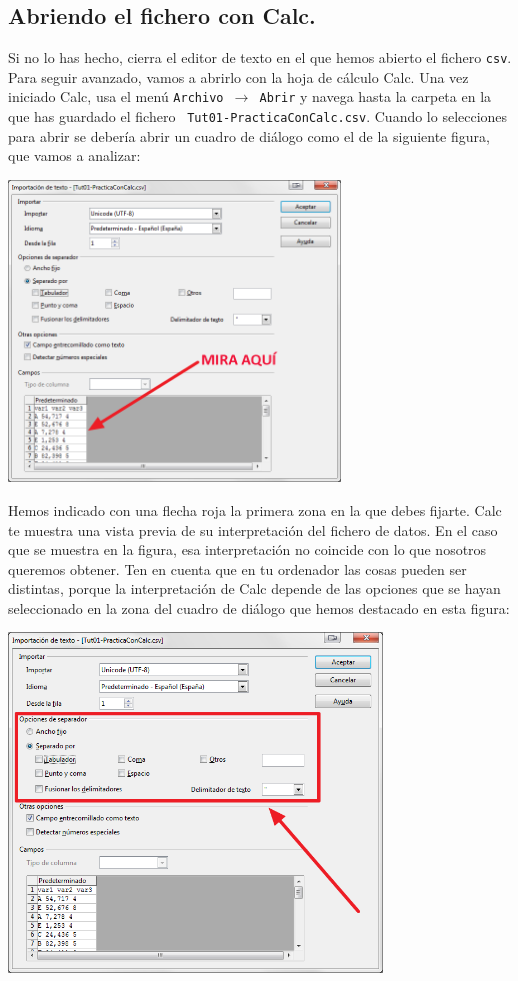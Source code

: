 \documentclass[10pt,a4paper]{article}
\begin{document}
\subsection{Abriendo el fichero con Calc.}

Si no lo has hecho, cierra el editor de texto en el que hemos abierto el fichero {\tt csv}. Para
seguir avanzado, vamos a abrirlo con la hoja de cálculo Calc. Una vez iniciado Calc, usa el menú
{\tt Archivo $\to$ Abrir} y navega hasta la carpeta en la que has guardado el fichero {\tt
Tut01-PracticaConCalc.csv}. Cuando lo selecciones para abrir se debería abrir un cuadro de diálogo
como el de la siguiente figura, que vamos a analizar:
        \begin{center}
        \includegraphics[height=8cm]{../fig/Tut00-Calc-csv-01.png}
        \end{center}
Hemos indicado con una flecha roja la primera zona en la que debes fijarte. Calc te muestra una
vista previa de su interpretación del fichero de datos. En el caso que se muestra en la figura, esa
interpretación no coincide con lo que nosotros queremos obtener. Ten en cuenta que en tu ordenador
las cosas pueden ser distintas, porque la interpretación de Calc depende de las opciones que se
hayan seleccionado en la zona del cuadro de diálogo que hemos destacado en esta figura:
        \begin{center}
        \includegraphics[height=9cm]{../fig/Tut00-Calc-csv-02.png}
        \end{center}
\end{document}
